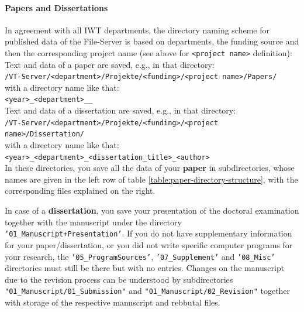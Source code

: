\paragraph{Papers and Dissertations}

\noindent In agreement with all IWT departments, the directory naming scheme for
published data of the File-Server is based on departments, the funding source
and then the corresponding project name (see above for \texttt{<project name>}
definition):
\\
Text and data of a paper are saved, e.g., in that directory:  \\
\texttt{/VT-Server/<department>/Projekte/<funding>/<project name>/Papers/} \\
with a directory name like that:
\\
\texttt{<year>\_<department>\_<paper-name>\_<first author>} \\
Text and data of a dissertation are saved, e.g., in that directory:
\\
\texttt{/VT-Server/<department>/Projekte/<funding>/<project name>/Dissertation/} \\
with a directory name like that:
\\
\texttt{<year>\_<department>\_<dissertation\_title>\_<author>} \\
In these directories, you save all the data of your \textbf{paper} in
subdirectories, whose names are given in the left row of table
\ref{table:paper-directory-structure}, with the corresponding
files explained on the right.




\begin{table}[!h]
  \caption{%
  The data of every paper has to be saved in eight subdirectories;
  further remarks: \\
  **When the paper is ready for press the corresponding author loads the last and
  revised version (i.e. only the real used but absolutely complete data) into
  the protected directory \\
  ***If the data reproduced in a figure/table is from distributed primary data
  directories, it is sufficient to save here only the generating program%
  }

\label{table:paper-directory-structure}
\end{table}



In case of a \textbf{dissertation}, you save your presentation of the doctoral examination together with the manuscript under the directory \texttt{'01\_Manuscript+Presentation'}. If you do not have supplementary information for your paper/dissertation, or you did not write specific computer programs for your research, the \texttt{'05\_ProgramSources'}, \texttt{'07\_Supplement'} and \texttt{'08\_Misc'} directories must still be
there but with no entries. Changes on the manuscript due to the revision process can be understood by subdirectories \texttt{"01\_Manuscript/01\_Submission"} and \texttt{"01\_Manuscript/02\_Revision"} together with storage of the respective manuscript and rebbutal files.




